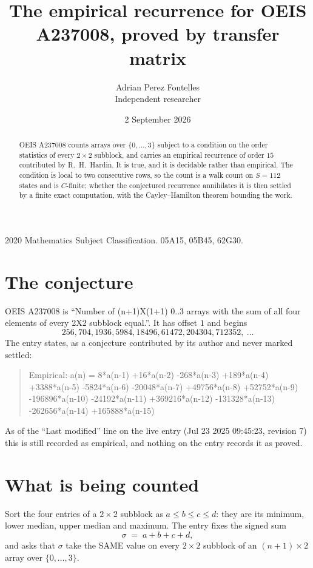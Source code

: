 \documentclass[11pt,a4paper]{article}
\title{The empirical recurrence for OEIS A237008, proved by transfer matrix}
\author{Adrian Perez Fontelles\\ \small Independent researcher}
\date{2 September 2026}
\theoremstyle{plain}
\theoremstyle{definition}
\begin{document}
\maketitle

\begin{abstract}
OEIS A237008 counts arrays over $\{0,\dots,3\}$ subject to a condition on the order
statistics of every $2\times2$ subblock, and carries an empirical recurrence of order
$15$ contributed by R.~H.~Hardin. It is true, and it is decidable rather than empirical.
The condition is local to two consecutive rows, so the count is a walk count on $S=112$
states and is $C$-finite; whether the conjectured recurrence annihilates it is then settled by
a finite exact computation, with the Cayley--Hamilton theorem bounding the work.
\end{abstract}

\noindent\small 2020 Mathematics Subject Classification. 05A15, 05B45, 62G30.\normalsize

\section{The conjecture}

OEIS A237008 is ``Number of (n+1)X(1+1) 0..3 arrays with the sum of all four elements of every 2X2 subblock equal.''. It has offset $1$ and begins
\[
256, 704, 1936, 5984, 18496, 61472, 204304, 712352,\ \dots
\]
The entry states, as a conjecture contributed by its author and never marked settled:
\begin{quote}
Empirical: a(n) = 8*a(n-1) +16*a(n-2) -268*a(n-3) +189*a(n-4) +3388*a(n-5) -5824*a(n-6) -20048*a(n-7) +49756*a(n-8) +52752*a(n-9) -196896*a(n-10) -24192*a(n-11) +369216*a(n-12) -131328*a(n-13) -262656*a(n-14) +165888*a(n-15)
\end{quote}
As of the ``Last modified'' line on the live entry (Jul 23 2025 09:45:23, revision 7) this is still
recorded as empirical, and nothing on the entry records it as proved.

\section{What is being counted}

Sort the four entries of a $2\times2$ subblock as $a\le b\le c\le d$: they
are its minimum, lower median, upper median and maximum. The entry fixes the signed sum
\[
\sigma\;=\;a+b+c+d,
\]
and asks that $\sigma$ take the SAME value on every $2\times2$ subblock of an
$(n+1)\times2$ array over $\{0,\dots,3\}$.
\end{document}
